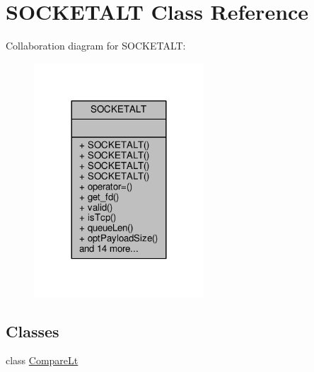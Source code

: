 \hypertarget{classSOCKETALT}{}\section{S\+O\+C\+K\+E\+T\+A\+LT Class Reference}
\label{classSOCKETALT}


Collaboration diagram for S\+O\+C\+K\+E\+T\+A\+LT\+:
\nopagebreak
\begin{figure}[H]
\begin{center}
\leavevmode
\includegraphics[width=180pt]{d6/d04/classSOCKETALT__coll__graph}
\end{center}
\end{figure}
\subsection*{Classes}
\begin{DoxyCompactItemize}
\item 
class \hyperlink{classSOCKETALT_1_1CompareLt}{Compare\+Lt}
\end{DoxyCompactItemize}
